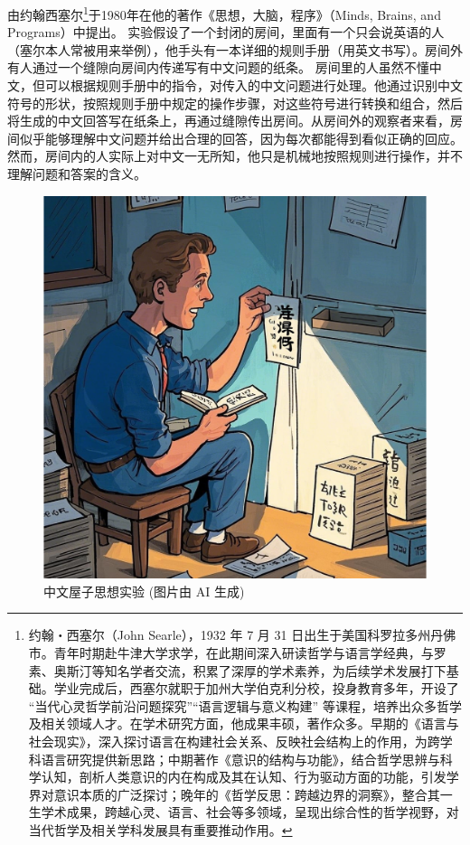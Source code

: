 由约翰西塞尔\footnote{约翰・西塞尔（John Searle），1932 年 7 月 31 日出生于美国科罗拉多州丹佛市。青年时期赴牛津大学求学，在此期间深入研读哲学与语言学经典，与罗素、奥斯汀等知名学者交流，积累了深厚的学术素养，为后续学术发展打下基础。学业完成后，西塞尔就职于加州大学伯克利分校，投身教育多年，开设了 “当代心灵哲学前沿问题探究”“语言逻辑与意义构建” 等课程，培养出众多哲学及相关领域人才。在学术研究方面，他成果丰硕，著作众多。早期的《语言与社会现实》，深入探讨语言在构建社会关系、反映社会结构上的作用，为跨学科语言研究提供新思路；中期著作《意识的结构与功能》，结合哲学思辨与科学认知，剖析人类意识的内在构成及其在认知、行为驱动方面的功能，引发学界对意识本质的广泛探讨；晚年的《哲学反思：跨越边界的洞察》，整合其一生学术成果，跨越心灵、语言、社会等多领域，呈现出综合性的哲学视野，对当代哲学及相关学科发展具有重要推动作用。}于1980年在他的著作《思想，大脑，程序》（Minds, Brains, and Programs）中提出。
实验假设了一个封闭的房间，里面有一个只会说英语的人（塞尔本人常被用来举例），他手头有一本详细的规则手册（用英文书写）。房间外有人通过一个缝隙向房间内传递写有中文问题的纸条。
房间里的人虽然不懂中文，但可以根据规则手册中的指令，对传入的中文问题进行处理。他通过识别中文符号的形状，按照规则手册中规定的操作步骤，对这些符号进行转换和组合，然后将生成的中文回答写在纸条上，再通过缝隙传出房间。从房间外的观察者来看，房间似乎能够理解中文问题并给出合理的回答，因为每次都能得到看似正确的回应。然而，房间内的人实际上对中文一无所知，他只是机械地按照规则进行操作，并不理解问题和答案的含义。

\begin{figure}[htb]
	\centering
	\includegraphics[width=0.75\linewidth]{image/1/中文屋.png}
	\caption{中文屋子思想实验 (图片由 AI 生成)}
\end{figure}

